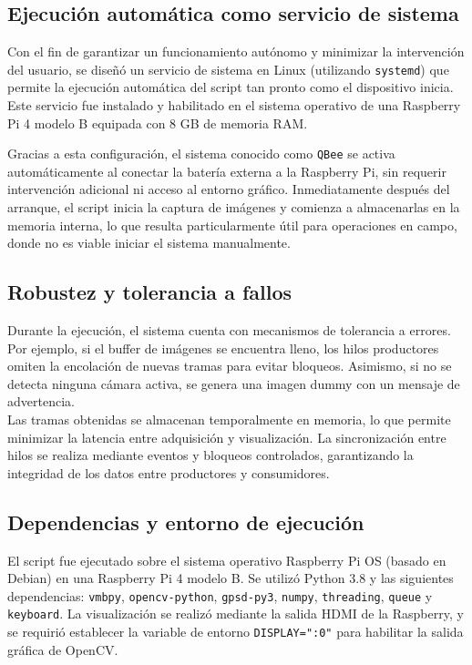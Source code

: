   \subsection{Ejecución automática como servicio de sistema}
  
  Con el fin de garantizar un funcionamiento autónomo y minimizar la intervención del usuario, se diseñó un servicio de sistema en Linux (utilizando \texttt{systemd}) que permite la ejecución automática del script tan pronto como el dispositivo inicia. Este servicio fue instalado y habilitado en el sistema operativo de una Raspberry Pi 4 modelo B equipada con 8 GB de memoria RAM.
  
  Gracias a esta configuración, el sistema conocido como \texttt{QBee} se activa automáticamente al conectar la batería externa a la Raspberry Pi, sin requerir intervención adicional ni acceso al entorno gráfico. Inmediatamente después del arranque, el script inicia la captura de imágenes y comienza a almacenarlas en la memoria interna, lo que resulta particularmente útil para operaciones en campo, donde no es viable iniciar el sistema manualmente.
  
  \subsection{Robustez y tolerancia a fallos}
  
  Durante la ejecución, el sistema cuenta con mecanismos de tolerancia a errores. Por ejemplo, si el buffer de imágenes se encuentra lleno, los hilos productores omiten la encolación de nuevas tramas para evitar bloqueos. Asimismo, si no se detecta ninguna cámara activa, se genera una imagen dummy con un mensaje de advertencia.\\
  
  Las tramas obtenidas se almacenan temporalmente en memoria, lo que permite minimizar la latencia entre adquisición y visualización. La sincronización entre hilos se realiza mediante eventos y bloqueos controlados, garantizando la integridad de los datos entre productores y consumidores.
  
  \subsection{Dependencias y entorno de ejecución}
  
  El script fue ejecutado sobre el sistema operativo Raspberry Pi OS (basado en Debian) en una Raspberry Pi 4 modelo B. Se utilizó Python 3.8 y las siguientes dependencias: \texttt{vmbpy}, \texttt{opencv-python}, \texttt{gpsd-py3}, \texttt{numpy}, \texttt{threading}, \texttt{queue} y \texttt{keyboard}. La visualización se realizó mediante la salida HDMI de la Raspberry, y se requirió establecer la variable de entorno \texttt{DISPLAY=":0"} para habilitar la salida gráfica de OpenCV.

